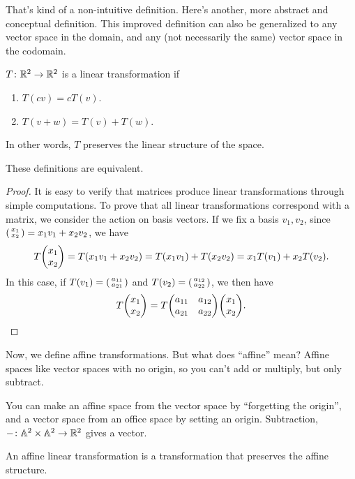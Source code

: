 That's kind of a non-intuitive definition. Here's another, more abstract and conceptual definition. This improved definition can also be generalized to any vector space in the domain, and any (not necessarily the same) vector space in the codomain. 

\begin{definition}
    $T \colon \mathbb R^2 \to \mathbb R^2$ is a linear transformation if \begin{enumerate}
        \item $T(cv) = cT(v)$.
        \item $T(v + w) = T(v) + T(w)$.
    \end{enumerate}
    In other words, $T$ preserves the linear structure of the space.
\end{definition}

\begin{proposition}
    These definitions are equivalent.
\end{proposition}

\begin{proof}
    It is easy to verify that matrices produce linear transformations through simple computations. To prove that all linear transformations correspond with a matrix, we consider the action on basis vectors. If we fix a basis $v_1, v_2$, since $\smqty(x_1\\ x_2) = x_1v_1 + x_2v_2$, we have \[T\mqty(x_1\\ x_2) = T(x_1v_1 + x_2v_2) = T(x_1v_1) + T(x_2v_2) = x_1T(v_1) + x_2T(v_2).\] In this case, if $T(v_1) = \smqty(a_{11} \\ a_{21})$ and $T(v_2) = \smqty(a_{12} \\ a_{22})$, we then have \[T\mqty(x_1 \\ x_2) = T\mqty(a_{11} & a_{12} \\ a_{21} & a_{22})\mqty(x_1 \\ x_2).\]
\end{proof}

Now, we define affine transformations. But what does ``affine'' mean? Affine spaces like vector spaces with no origin, so you can't add or multiply, but only subtract.

You can make an affine space from the vector space by ``forgetting the origin'', and a vector space from an office space by setting an origin. Subtraction, $- \colon \mathbb A^2 \times \mathbb A^2 \to \mathbb R^2$ gives a vector.

\begin{definition}
    An affine linear transformation is a transformation that preserves the affine structure. 
\end{definition}

